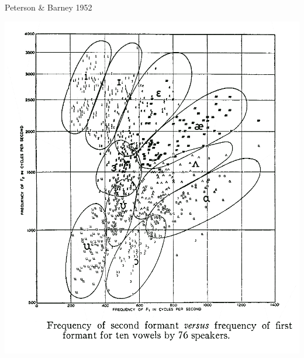 \documentclass[9pt,xcolor=pdftex,dvipsnames,table]{beamer}
\begin{document}
\subsection{}
\begin{frame}{Peterson \& Barney 1952}

	\begin{center}
    \includegraphics[scale=.2]{PetersonBarney52}
	\end{center}
	
\end{frame}
\end{document}
